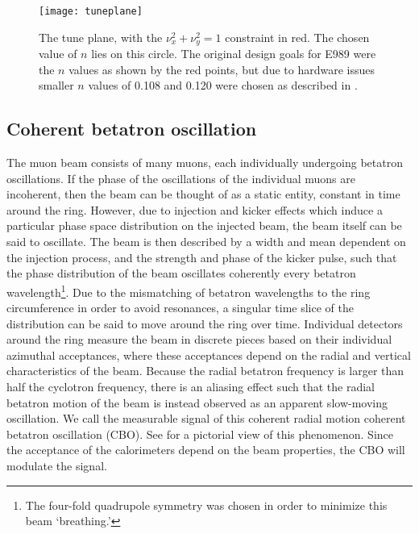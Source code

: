 

\begin{figure}[]
    \centering
    \texttt{[image: tuneplane]}
    \caption[Tune plane]{The tune plane, with the $\nu_{x}^{2} + \nu_{y}^{2} = 1$ constraint in red. The chosen value of $n$ lies on this circle. The original design goals for E989 were the $n$ values as shown by the red points, but due to hardware issues smaller $n$ values of 0.108 and 0.120 were chosen as described in .}
    \label{fig:tuneplane}
\end{figure}



\subsection{Coherent betatron oscillation}
\label{sub:CBO}

The muon beam consists of many muons, each individually undergoing betatron oscillations. If the phase of the oscillations of the individual muons are incoherent, then the beam can be thought of as a static entity, constant in time around the ring. However, due to injection and kicker effects which induce a particular phase space distribution on the injected beam, the beam itself can be said to oscillate. The beam is then described by a width and mean dependent on the injection process, and the strength and phase of the kicker pulse, such that the phase distribution of the beam oscillates coherently every betatron wavelength\footnote{The four-fold quadrupole symmetry was chosen in order to minimize this beam `breathing.'}. Due to the mismatching of betatron wavelengths to the ring circumference in order to avoid resonances, a singular time slice of the distribution can be said to move around the ring over time. Individual detectors around the ring measure the beam in discrete pieces based on their individual azimuthal acceptances, where these acceptances depend on the radial and vertical characteristics of the beam. Because the radial betatron frequency is larger than half the cyclotron frequency, there is an aliasing effect such that the radial betatron motion of the beam is instead observed as an apparent slow-moving oscillation. We call the measurable signal of this coherent radial motion coherent betatron oscillation (CBO). See  for a pictorial view of this phenomenon. Since the acceptance of the calorimeters depend on the beam properties, the CBO will modulate the \wa signal.

